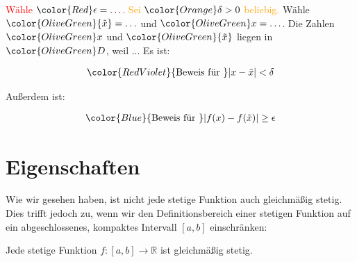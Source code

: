 \documentclass[fontsize=9pt,
               parskip=half-,
               DIV=14,
               listof=chapterentry,
               tocflat]{scrbook}
\begin{document}
\begin{importantparagraph*}
{\textcolor{Red}{Wähle ${\color {Red}\epsilon =\ldots }$.}} {\textcolor{Orange}{Sei ${\color {Orange}\delta >0}$ beliebig.}} {\textcolor{OliveGreen}{Wähle ${\color {OliveGreen}{\tilde {x}}=\ldots }$ und ${\color {OliveGreen}x=\ldots }$. Die Zahlen ${\color {OliveGreen}x}$ und ${\color {OliveGreen}{\tilde {x}}}$ liegen in ${\color {OliveGreen}D}$, weil ...}} {\textcolor{RedViolet}{Es ist:}}

\begin{align*}
{\color {RedViolet}{\text{Beweis für }}|x-{\tilde {x}}|<\delta }
\end{align*}

Außerdem ist:

\begin{align*}
{\color {Blue}{\text{Beweis für }}|f(x)-f({\tilde {x}})|\geq \epsilon }
\end{align*}

\end{importantparagraph*}

\section{Eigenschaften}

Wie wir gesehen haben, ist nicht jede stetige Funktion auch gleichmäßig stetig. Dies trifft jedoch zu, wenn wir den Definitionsbereich einer stetigen Funktion auf ein abgeschlossenes, kompaktes Intervall $[a,b]$ einschränken:

\begin{theorem*}
Jede stetige Funktion $f:[a,b]\to \mathbb {R} $ ist gleichmäßig stetig.

\end{theorem*}
\end{document}
